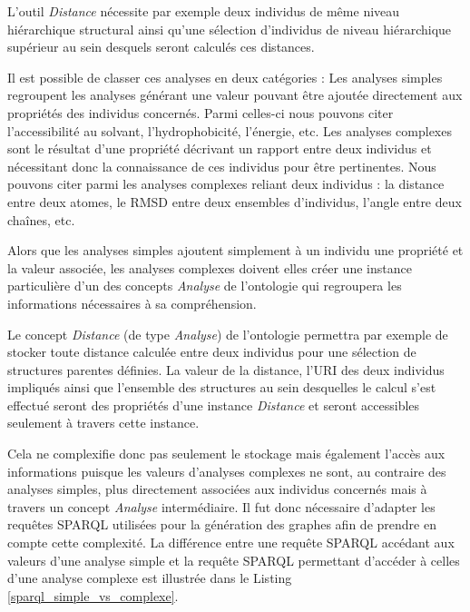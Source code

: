 
L'outil \textit{Distance} nécessite par exemple deux individus de même niveau hiérarchique structural ainsi qu'une sélection d'individus de niveau hiérarchique supérieur au sein desquels seront calculés ces distances. 

Il est possible de classer ces analyses en deux catégories : Les analyses simples regroupent les analyses générant une valeur pouvant être ajoutée directement aux propriétés des individus concernés. Parmi celles-ci nous pouvons citer l'accessibilité au solvant, l'hydrophobicité, l'énergie, etc. 
Les analyses complexes sont le résultat d'une propriété décrivant un rapport entre deux individus et nécessitant donc la connaissance de ces individus pour être pertinentes. Nous pouvons citer parmi les analyses complexes reliant deux individus : la distance entre deux atomes, le RMSD entre deux ensembles d'individus, l'angle entre deux chaînes, etc.

Alors que les analyses simples ajoutent simplement à un individu une propriété et la valeur associée, les analyses complexes doivent elles créer une instance particulière d'un des concepts \textit{Analyse} de l'ontologie qui regroupera les informations nécessaires à sa compréhension. 

Le concept \textit{Distance} (de type \textit{Analyse}) de l'ontologie permettra par exemple de stocker toute distance calculée entre deux individus pour une sélection de structures parentes définies. La valeur de la distance, l'URI des deux individus impliqués ainsi que l'ensemble des structures au sein desquelles le calcul s'est effectué seront des propriétés d'une instance \textit{Distance} et seront accessibles seulement à travers cette instance. 

Cela ne complexifie donc pas seulement le stockage mais également l'accès aux informations puisque les valeurs d'analyses complexes ne sont, au contraire des analyses simples, plus directement associées aux individus concernés mais à travers un concept \textit{Analyse} intermédiaire. Il fut donc nécessaire d'adapter les requêtes SPARQL utilisées pour la génération des graphes afin de prendre en compte cette complexité. La différence entre une requête SPARQL accédant aux valeurs d'une analyse simple et la requête SPARQL permettant d'accéder à celles d'une analyse complexe est illustrée dans le Listing \ref{sparql_simple_vs_complexe}.

